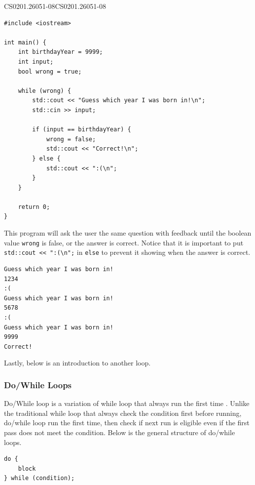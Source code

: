 \documentclass[../../../main.tex]{subfiles}
\begin{document}
\begin{cppbox}{CS0201.26051-08}{CS0201.26051-08}
\begin{lstlisting}[style=cppstyle]
#include <iostream>

int main() {
    int birthdayYear = 9999;
    int input;
    bool wrong = true;

    while (wrong) {
        std::cout << "Guess which year I was born in!\n";
        std::cin >> input;

        if (input == birthdayYear) {
            wrong = false;
            std::cout << "Correct!\n";
        } else {
            std::cout << ":(\n";
        }
    }

    return 0;
}
\end{lstlisting}
\end{cppbox}

This program will ask the user the same question with feedback
until the boolean value \verb|wrong| is false, or the answer is
correct. Notice that it is important to put
\verb|std::cout << ":(\n";| in \verb|else| to prevent it showing
when the answer is correct.

\begin{outputbox}
\begin{lstlisting}[style=basic]
Guess which year I was born in!
1234
:(
Guess which year I was born in!
5678
:(
Guess which year I was born in!
9999
Correct!
\end{lstlisting}
\end{outputbox}

Lastly, below is an introduction to another loop.

\subsubsection{Do/While Loops}

Do/While loop is a variation of while loop that always run the first
time \cite{CS02-4}. Unlike the traditional while loop that always
check the condition first before running, do/while loop run the first
time, then check if next run is eligible even if the first pass does
not meet the condition. Below is the general structure of do/while
loops.

\begin{basicbox}
\begin{lstlisting}[style=basic]
do {
    block
} while (condition);
\end{lstlisting}
\end{basicbox}
\end{document}
